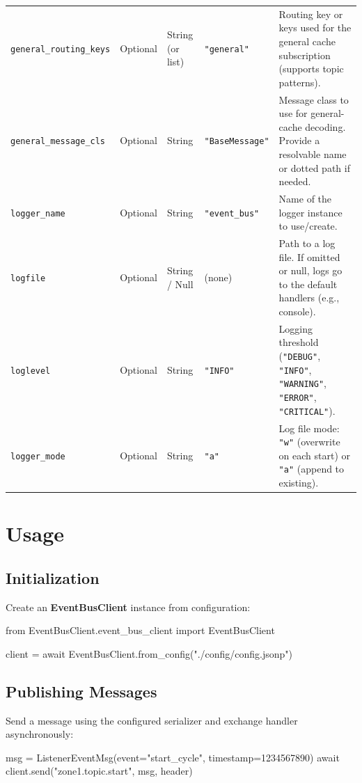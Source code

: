 \begin{longtable}{@{}p{4cm}p{2cm}p{2.2cm}p{3cm}p{6cm}@{}}
\texttt{general\_routing\_keys} & Optional & String (or list) & \texttt{"general"} & Routing key or keys used for the general cache subscription (supports topic patterns). \\

\texttt{general\_message\_cls} & Optional & String & \texttt{"BaseMessage"} & Message class to use for general-cache decoding. Provide a resolvable name or dotted path if needed. \\

\texttt{logger\_name} & Optional & String & \texttt{"event\_bus"} & Name of the logger instance to use/create. \\

\texttt{logfile} & Optional & String / Null & (none) & Path to a log file. If omitted or null, logs go to the default handlers (e.g., console). \\

\texttt{loglevel} & Optional & String & \texttt{"INFO"} & Logging threshold (\texttt{"DEBUG"}, \texttt{"INFO"}, \texttt{"WARNING"}, \texttt{"ERROR"}, \texttt{"CRITICAL"}). \\

\texttt{logger\_mode} & Optional & String & \texttt{"a"} & Log file mode: \texttt{"w"} (overwrite on each start) or \texttt{"a"} (append to existing). \\
\end{longtable}

\section{Usage}\label{sec:usage}

\subsection{Initialization}
Create an \textbf{EventBusClient} instance from configuration:
\begin{pythoncode}
from EventBusClient.event_bus_client import EventBusClient

client = await EventBusClient.from_config("./config/config.jsonp")
\end{pythoncode}


\subsection{Publishing Messages}
Send a message using the configured serializer and exchange handler asynchronously:
\begin{pythoncode}
msg = ListenerEventMsg(event="start_cycle", timestamp=1234567890)
await client.send("zone1.topic.start", msg, header)
\end{pythoncode}


